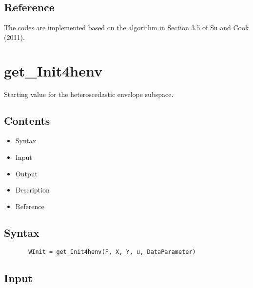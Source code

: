 \documentclass[a4paper,11pt,openany]{memoir}
\begin{document}
\subsection*{Reference}

\begin{par}
The codes are implemented based on the algorithm in Section 3.5 of Su and Cook (2011).
\end{par} \vspace{1em}

\newpage

\rmfamily
\color{black}\section{get\_Init4henv}

\begin{par}
Starting value for the heteroscedastic envelope subspace.
\end{par} \vspace{1em}

\subsection*{Contents}

\begin{itemize}
\setlength{\itemsep}{-1ex}
   \item Syntax
   \item Input
   \item Output
   \item Description
   \item Reference
\end{itemize}


\subsection*{Syntax}


\begin{verbatim}       WInit = get_Init4henv(F, X, Y, u, DataParameter)\end{verbatim}
    

\subsection*{Input}
\end{document}
